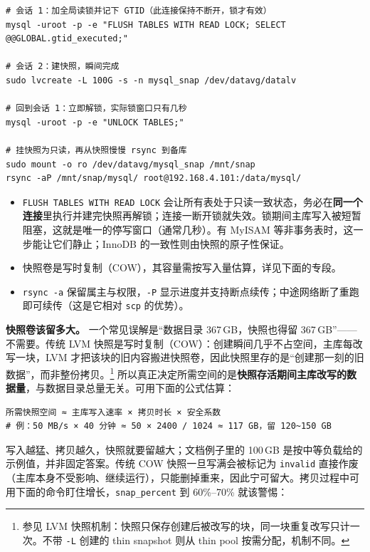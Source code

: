 \documentclass[12pt,UTF8]{ctexbook}
\begin{document}
\begin{lstlisting}
# 会话 1：加全局读锁并记下 GTID（此连接保持不断开，锁才有效）
mysql -uroot -p -e "FLUSH TABLES WITH READ LOCK; SELECT @@GLOBAL.gtid_executed;"

# 会话 2：建快照，瞬间完成
sudo lvcreate -L 100G -s -n mysql_snap /dev/datavg/datalv

# 回到会话 1：立即解锁，实际锁窗口只有几秒
mysql -uroot -p -e "UNLOCK TABLES;"

# 挂快照为只读，再从快照慢慢 rsync 到备库
sudo mount -o ro /dev/datavg/mysql_snap /mnt/snap
rsync -aP /mnt/snap/mysql/ root@192.168.4.101:/data/mysql/
\end{lstlisting}

\begin{itemize}[leftmargin=2cm]
  \item \texttt{FLUSH TABLES WITH READ LOCK} 会让所有表处于只读一致状态，务必在\textbf{同一个连接}里执行并建完快照再解锁；连接一断开锁就失效。锁期间主库写入被短暂阻塞，这就是唯一的停写窗口（通常几秒）。有 MyISAM 等非事务表时，这一步能让它们静止；InnoDB 的一致性则由快照的原子性保证。
  \item 快照卷是写时复制（COW），其容量需按写入量估算，详见下面的专段。
  \item \texttt{rsync -a} 保留属主与权限，\texttt{-P} 显示进度并支持断点续传；中途网络断了重跑即可续传（这是它相对 \texttt{scp} 的优势）。
\end{itemize}

\textbf{快照卷该留多大。} 一个常见误解是“数据目录 367\,GB，快照也得留 367\,GB”——不需要。传统 LVM 快照是写时复制（COW）：创建瞬间几乎不占空间，主库每改写一块，LVM 才把该块的旧内容搬进快照卷，因此快照里存的是“创建那一刻的旧数据”，而非整份拷贝。\footnote{参见 LVM 快照机制：快照只保存创建后被改写的块，同一块重复改写只计一次。不带 \texttt{-L} 创建的 thin snapshot 则从 thin pool 按需分配，机制不同。} 所以真正决定所需空间的是\textbf{快照存活期间主库改写的数据量}，与数据目录总量无关。可用下面的公式估算：

\begin{lstlisting}
所需快照空间 ≈ 主库写入速率 × 拷贝时长 × 安全系数
# 例：50 MB/s × 40 分钟 ≈ 50 × 2400 / 1024 ≈ 117 GB，留 120~150 GB
\end{lstlisting}

写入越猛、拷贝越久，快照就要留越大；文档例子里的 100\,GB 是按中等负载给的示例值，并非固定答案。传统 COW 快照一旦写满会被标记为 \texttt{invalid} 直接作废（主库本身不受影响、继续运行），只能删掉重来，因此宁可留大。拷贝过程中可用下面的命令盯住增长，\texttt{snap\_percent} 到 60\%--70\% 就该警惕：
\end{document}
